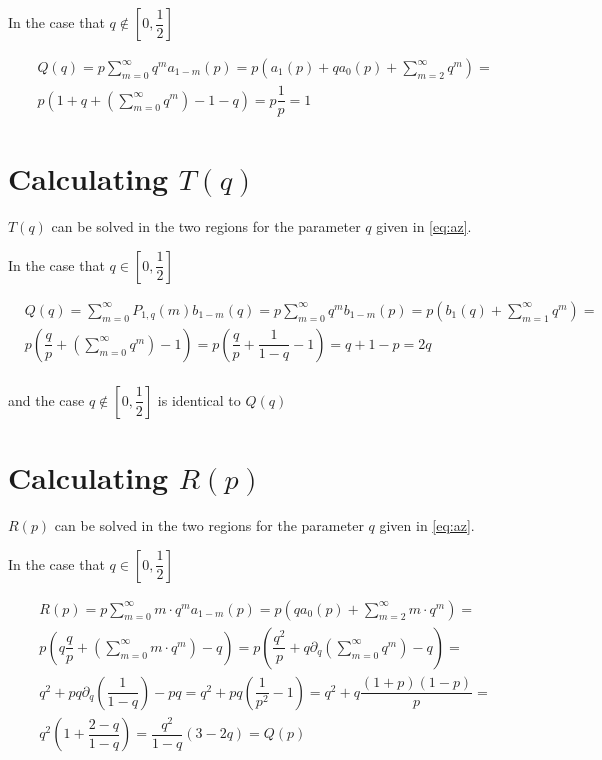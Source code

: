 \documentclass[letterpaper,12pt]{report}
\theoremstyle{plain}
\theoremstyle{definition}
\begin{document}
In the case  that $q\notin [0,\dfrac{1}{2}]$

\begin{eqnarray}\nonumber
&\mathit{Q}(q)=p\sum_{m=0}^{\infty}q^m\mathit{a}_{1-m}(p)=p\left(
\mathit{a}_1(p)+q\mathit{a}_0(p)+\sum_{m=2}^{\infty}q^m
 \right)=\\\nonumber
 &p
\left(1+q+\left(\sum_{m=0}^{\infty}q^m\right)-1-q
 \right) 
 =p\dfrac{1}{p}=1
\end{eqnarray}

\section{Calculating $\mathit{T}(q)$ } \label{app:calctofp} 

$\mathit{T}(q)$  can be solved in the two regions for the parameter $q$ given in \ref{eq:az}.

In the case  that $q\in [0,\dfrac{1}{2}]$

\begin{eqnarray}\label{eq:rpcalc}\nonumber
&\mathit{Q}(q)=\sum_{m=0}^{\infty}\mathit{P}_{1,q}(m)\mathit{b}_{1-m}(q)=p\sum_{m=0}^{\infty}q^m\mathit{b}_{1-m}(p)=p\left(
\mathit{b}_1(q)+\sum_{m=1}^{\infty}q^m
 \right)=\\\nonumber
 &p\left(
\dfrac{q}{p}+\left(\sum_{m=0}^{\infty}q^m\right)-1
 \right) 
 =p\left(
\dfrac{q}{p}+\dfrac{1}{1-q}-1
 \right)=q+1-p=2q\\\nonumber
\end{eqnarray}

and the case $q\notin [0,\dfrac{1}{2}]$ is identical to $\mathit{Q}(q)$

\section{Calculating $\mathit{R}(p)$ } \label{app:calcrofp}  

$\mathit{R}(p)$  can be solved in the two regions for the parameter $q$ given in \ref{eq:az}.

In the case  that $q\in [0,\dfrac{1}{2}]$

\begin{eqnarray}\label{eq:rpcalc}\nonumber
&\mathit{R}(p)=p\sum_{m=0}^{\infty}m\cdot q^m\mathit{a}_{1-m}(p)=p\left(
q\mathit{a}_0(p)+\sum_{m=2}^{\infty}m\cdot q^m
 \right)=\\\nonumber
 &p\left(
q\dfrac{q}{p}+\left(\sum_{m=0}^{\infty}m\cdot q^m\right)-q
 \right) 
 =p\left(
\dfrac{q^2}{p}+q\partial_q\left(\sum_{m=0}^{\infty} q^m\right)-q
 \right)=\\\nonumber
& q^2+pq\partial_q\left(\dfrac{1}{1-q}\right)-pq 
 = q^2+pq\left(\dfrac{1}{p^2} -1\right) =q^2+q\dfrac{(1+p)(1-p)}{p}=
 \\\nonumber
& q^2\left(1+\dfrac{2-q}{1-q}\right)= \dfrac{q^2}{1-q}\left(
3-2q\right)=\mathit{Q}(p)
\end{eqnarray}
\end{document}
